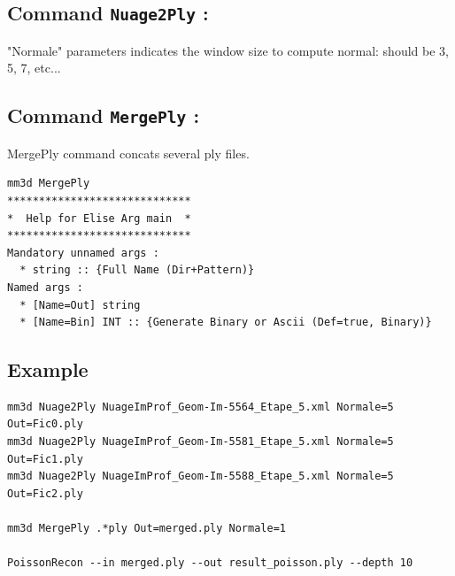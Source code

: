 \subsection{Command {\tt Nuage2Ply} :}

"Normale" parameters indicates the window size to compute normal: should be 3, 5, 7, etc...

\subsection{Command {\tt MergePly} :}

MergePly command concats several ply files.

\begin{verbatim}
mm3d MergePly
*****************************
*  Help for Elise Arg main  *
*****************************
Mandatory unnamed args :
  * string :: {Full Name (Dir+Pattern)}
Named args :
  * [Name=Out] string
  * [Name=Bin] INT :: {Generate Binary or Ascii (Def=true, Binary)}
\end{verbatim}

\subsection{Example}

\begin{verbatim}
mm3d Nuage2Ply NuageImProf_Geom-Im-5564_Etape_5.xml Normale=5 Out=Fic0.ply
mm3d Nuage2Ply NuageImProf_Geom-Im-5581_Etape_5.xml Normale=5 Out=Fic1.ply
mm3d Nuage2Ply NuageImProf_Geom-Im-5588_Etape_5.xml Normale=5 Out=Fic2.ply

mm3d MergePly .*ply Out=merged.ply Normale=1

PoissonRecon --in merged.ply --out result_poisson.ply --depth 10
\end{verbatim}

